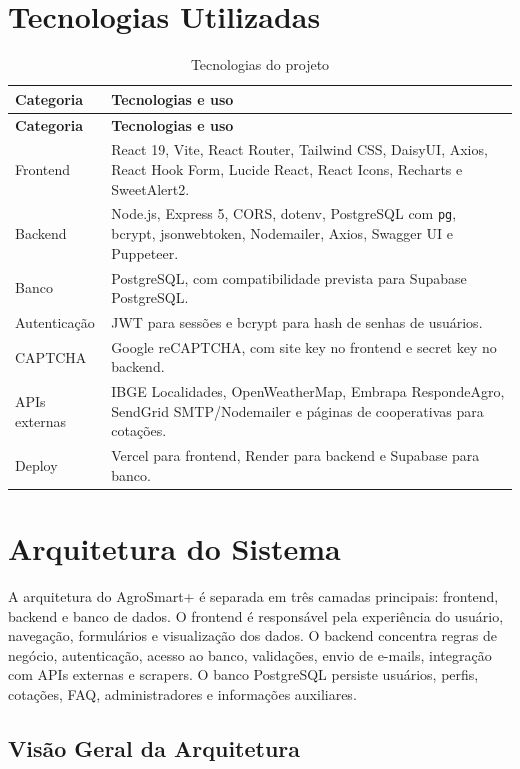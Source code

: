 \documentclass[
  12pt,
  oneside,
  a4paper,
  brazil
]{abntex2}
\begin{document}
\chapter{Tecnologias Utilizadas}

\begin{longtable}{@{}p{}p{}@{}}
\caption{Tecnologias do projeto}\\
\toprule
\textbf{Categoria} & \textbf{Tecnologias e uso} \\
\midrule
\endfirsthead
\toprule
\textbf{Categoria} & \textbf{Tecnologias e uso} \\
\midrule
\endhead
Frontend & React 19, Vite, React Router, Tailwind CSS, DaisyUI, Axios, React Hook Form, Lucide React, React Icons, Recharts e SweetAlert2. \\
Backend & Node.js, Express 5, CORS, dotenv, PostgreSQL com \texttt{pg}, bcrypt, jsonwebtoken, Nodemailer, Axios, Swagger UI e Puppeteer. \\
Banco & PostgreSQL, com compatibilidade prevista para Supabase PostgreSQL. \\
Autenticação & JWT para sessões e bcrypt para hash de senhas de usuários. \\
CAPTCHA & Google reCAPTCHA, com site key no frontend e secret key no backend. \\
APIs externas & IBGE Localidades, OpenWeatherMap, Embrapa RespondeAgro, SendGrid SMTP/Nodemailer e páginas de cooperativas para cotações. \\
Deploy & Vercel para frontend, Render para backend e Supabase para banco. \\
\bottomrule
\end{longtable}

\chapter{Arquitetura do Sistema}

A arquitetura do AgroSmart+ é separada em três camadas principais: frontend, backend e banco de dados. O frontend é responsável pela experiência do usuário, navegação, formulários e visualização dos dados. O backend concentra regras de negócio, autenticação, acesso ao banco, validações, envio de e-mails, integração com APIs externas e scrapers. O banco PostgreSQL persiste usuários, perfis, cotações, FAQ, administradores e informações auxiliares.

\section{Visão Geral da Arquitetura}
\end{document}
